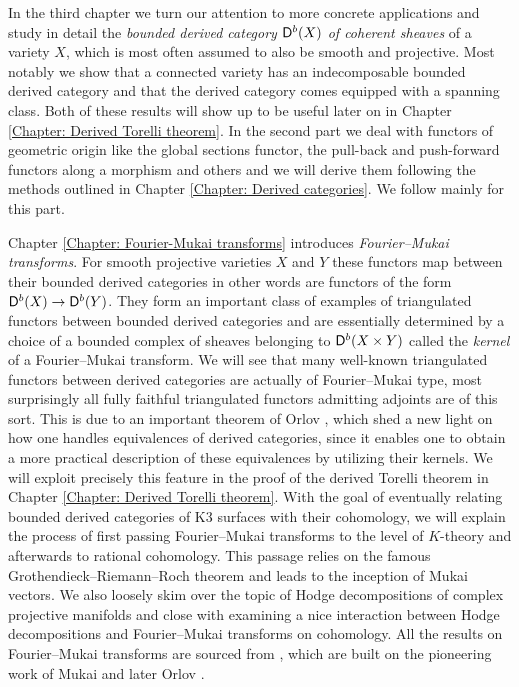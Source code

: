 In the third chapter we turn our attention to more concrete applications and study in detail the \emph{bounded derived category $\mathsf{D}^b(X)$ of coherent sheaves} of a variety $X$, which is most often assumed to also be smooth and projective. Most notably we show that a connected variety has an indecomposable bounded derived category and that the derived category comes equipped with a spanning class. Both of these results will show up to be useful later on in Chapter \ref{Chapter: Derived Torelli theorem}. In the second part we deal with functors of geometric origin like the global sections functor, the pull-back and push-forward functors along a morphism and others and we will derive them following the methods outlined in Chapter \ref{Chapter: Derived categories}. We follow mainly \cite[\S 3]{huybrechts2006fouriermukai} for this part.

Chapter \ref{Chapter: Fourier-Mukai transforms} introduces \emph{Fourier--Mukai transforms}. For smooth projective varieties $X$ and $Y$ these functors map between their bounded derived categories in other words are functors of the form $\mathsf{D}^b(X) \to \mathsf{D}^b(Y)$. They form an important class of examples of triangulated functors between bounded derived categories and are essentially determined by a choice of a bounded complex of sheaves belonging to $\mathsf{D}^b(X \times Y)$ called the \emph{kernel} of a Fourier--Mukai transform. We will see that many well-known triangulated functors between  derived categories 
are actually of Fourier--Mukai type, most surprisingly all fully faithful triangulated functors admitting adjoints are of this sort. This is due to an important theorem of Orlov \cite{Orlov2003}, which shed a new light on how one handles equivalences of derived categories, since it enables one to obtain a more practical description of these equivalences by utilizing their kernels. We will exploit precisely this feature in the proof of the derived Torelli theorem in Chapter \ref{Chapter: Derived Torelli theorem}. With the goal of eventually relating bounded derived categories of K3 surfaces with their cohomology, we will explain the process of first passing Fourier--Mukai transforms to the level of $K$-theory and afterwards to rational cohomology. This passage relies on the famous Grothendieck--Riemann--Roch theorem and leads to the inception of Mukai vectors. 
We also loosely skim over the topic of Hodge decompositions of complex projective manifolds and close with examining a nice interaction between Hodge decompositions and Fourier--Mukai transforms on cohomology. All the results on Fourier--Mukai transforms are sourced from \cite[\S 5]{huybrechts2006fouriermukai}, which are built on the pioneering work of Mukai \cite{Mukai1981} and later Orlov \cite{Orlov2003}.

